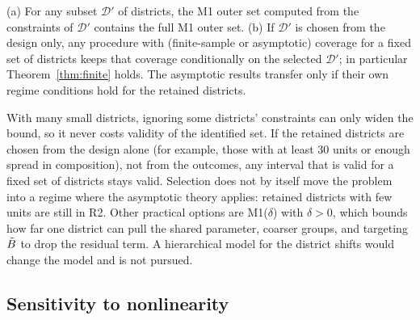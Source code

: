 \begin{proposition}\label{prop:select}
(a) For any subset $\mathcal D'$ of districts, the M1 outer set computed from the
constraints of $\mathcal D'$ contains the full M1 outer set. (b) If $\mathcal D'$ is
chosen from the design only, any procedure with (finite-sample or asymptotic)
coverage for a fixed set of districts keeps that coverage conditionally on the
selected $\mathcal D'$; in particular Theorem~\ref{thm:finite} holds. The asymptotic
results transfer only if their own regime conditions hold for the retained
districts.
\end{proposition}
\begin{reading}
With many small districts, ignoring some districts' constraints can only widen the
bound, so it never costs validity of the identified set. If the retained districts
are chosen from the design alone (for example, those with at least 30 units or
enough spread in composition), not from the outcomes, any interval that is valid
for a fixed set of districts stays valid. Selection does not by itself move the
problem into a regime where the asymptotic theory applies: retained districts with
few units are still in R2. Other practical options are M1($\delta$) with $\delta>0$,
which bounds how far one district can pull the shared parameter, coarser groups,
and targeting $\tilde B$ to drop the residual term. A hierarchical model for the district
shifts would change the model and is not pursued.
\end{reading}

\subsection{Sensitivity to nonlinearity}\label{sec:sensitivity}

